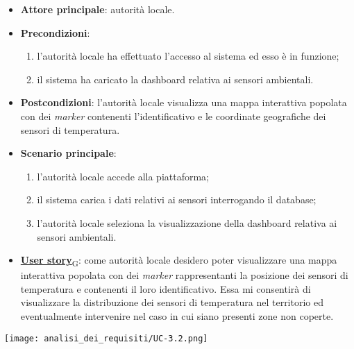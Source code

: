 \begin{itemize}
	\item \textbf{Attore principale}: autorità locale.
	\item \textbf{Precondizioni}:
	      \begin{enumerate}
		      \item l'autorità locale ha effettuato l'accesso al sistema ed esso è in funzione;
		      \item il sistema ha caricato la dashboard relativa ai sensori ambientali.
	      \end{enumerate}
	\item \textbf{Postcondizioni}: l'autorità locale visualizza una mappa interattiva popolata con dei \textit{marker} contenenti l'identificativo e le coordinate geografiche dei sensori di temperatura.
	\item \textbf{Scenario principale}:
	      \begin{enumerate}
		      \item l'autorità locale accede alla piattaforma;
		      \item il sistema carica i dati relativi ai sensori interrogando il database;
		      \item l'autorità locale seleziona la visualizzazione della dashboard relativa ai sensori ambientali.
	      \end{enumerate}
	\item \href{https://7last.github.io/docs/pb/documentazione-interna/glossario\#user-story}{\textbf{User story}\textsubscript{G}}:
	      come autorità locale desidero poter visualizzare una mappa interattiva popolata con dei \textit{marker} rappresentanti la posizione dei sensori di temperatura e contenenti il loro identificativo. Essa mi consentirà di visualizzare la distribuzione dei sensori di temperatura nel territorio ed eventualmente intervenire nel caso in cui siano presenti zone non coperte.
\end{itemize}
\begin{center}
	\texttt{[image: analisi\_dei\_requisiti/UC-3.2.png]}
\end{center}


